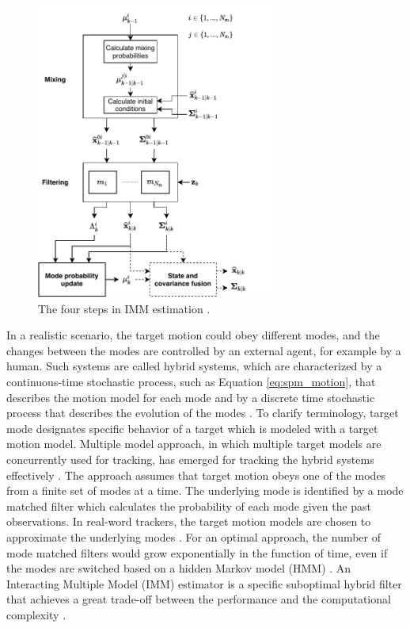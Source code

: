 \documentclass[english, 12pt, a4paper, elec, utf8, a-1b, online]{aaltothesis}
\begin{document}
\begin{figure}[b]
    \centering
    \includegraphics[width=0.7\textwidth]{figures/IMM.pdf}
    \caption{
    The four steps in IMM estimation \cite{BarShalom2001}.}
    \label{fig:IMM}
\end{figure}

In a realistic scenario, the target motion could obey different modes, and the changes between the modes are controlled by an external agent, for example by a human.
Such systems are called hybrid systems, which are characterized by a continuous-time stochastic process, such as Equation \eqref{eq:spm_motion}, that describes the motion model for each mode and by a discrete time stochastic process that describes the evolution of the modes \cite{Mazor1998}.
To clarify terminology, target mode designates specific behavior of a target which is modeled with a target motion model.
Multiple model approach, in which multiple target models are concurrently used for tracking, has emerged for tracking the hybrid systems effectively \cite{BarShalom2001}.
The approach assumes that target motion obeys one of the modes from a finite set of modes at a time.
The underlying mode is identified by a mode matched filter which calculates the probability of each mode given the past observations.
In real-word trackers, the target motion models are chosen to approximate the underlying modes \cite{Simeonova2002}.
For an optimal approach, the number of mode matched filters would grow exponentially in the function of time, even if the modes are switched based on a hidden Markov model (HMM) \cite{BarShalom2001}.
An Interacting Multiple Model (IMM) estimator is a specific suboptimal hybrid filter that achieves a great trade-off between the performance and the computational complexity \cite{Mazor1998}.
\end{document}
